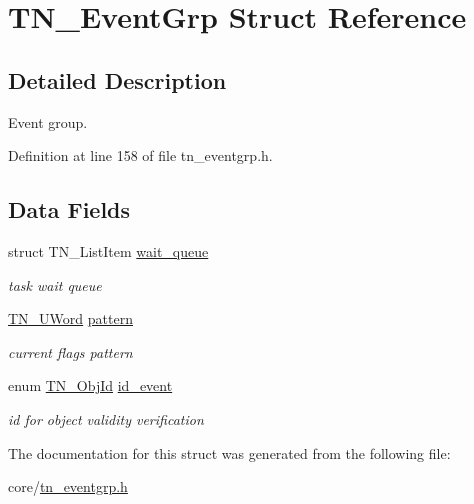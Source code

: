 \hypertarget{structTN__EventGrp}{\section{T\+N\+\_\+\+Event\+Grp Struct Reference}
\label{structTN__EventGrp}
}


\subsection{Detailed Description}
Event group. 

Definition at line 158 of file tn\+\_\+eventgrp.\+h.

\subsection*{Data Fields}
\begin{DoxyCompactItemize}
\item 
\hypertarget{structTN__EventGrp_a93da04331cafe905f9c8b2fa2bad648b}{struct T\+N\+\_\+\+List\+Item \hyperlink{structTN__EventGrp_a93da04331cafe905f9c8b2fa2bad648b}{wait\+\_\+queue}}\label{structTN__EventGrp_a93da04331cafe905f9c8b2fa2bad648b}

\begin{DoxyCompactList}\small\item\em task wait queue \end{DoxyCompactList}\item 
\hypertarget{structTN__EventGrp_abf45ee25e11ea46636920be5003cdec2}{\hyperlink{tn__arch__example_8h_ab80cba0fe9ffcd9011d53dfeb9e39bf4}{T\+N\+\_\+\+U\+Word} \hyperlink{structTN__EventGrp_abf45ee25e11ea46636920be5003cdec2}{pattern}}\label{structTN__EventGrp_abf45ee25e11ea46636920be5003cdec2}

\begin{DoxyCompactList}\small\item\em current flags pattern \end{DoxyCompactList}\item 
\hypertarget{structTN__EventGrp_a0bdf55b6117237122efeefcdf6802d37}{enum \hyperlink{tn__common_8h_ae779dd1f6735f6e139fb70acd004d976}{T\+N\+\_\+\+Obj\+Id} \hyperlink{structTN__EventGrp_a0bdf55b6117237122efeefcdf6802d37}{id\+\_\+event}}\label{structTN__EventGrp_a0bdf55b6117237122efeefcdf6802d37}

\begin{DoxyCompactList}\small\item\em id for object validity verification \end{DoxyCompactList}\end{DoxyCompactItemize}


The documentation for this struct was generated from the following file\+:\begin{DoxyCompactItemize}
\item 
core/\hyperlink{tn__eventgrp_8h}{tn\+\_\+eventgrp.\+h}\end{DoxyCompactItemize}
